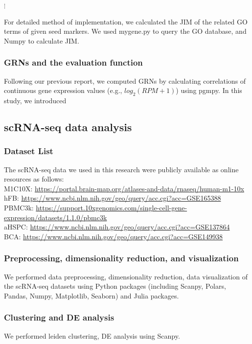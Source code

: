 \documentclass{article}
\begin{document}
$\vdots$

For detailed method of implementation, we calculated the JIM of the related GO terms of given seed markers. We used mygene.py\cite{mygene} to query the GO database, and Numpy\cite{numpy} to calculate JIM.

\subsubsection*{GRNs and the evaluation function}
Following our previous report\cite{okano2023set}, we computed GRNs by calculating
correlations of continuous gene expression values (e.g., $log_2(RPM+1)$) using pgmpy. In this study, we introduced

\subsection*{scRNA-seq data analysis}
\subsubsection*{Dataset List}
The scRNA-seq data we used in this research were publicly available as online
resources as follows:\\
M1C10X: \url{https://portal.brain-map.org/atlases-and-data/rnaseq/human-m1-10x}\\
hFB: \url{https://www.ncbi.nlm.nih.gov/geo/query/acc.cgi?acc=GSE165388}\\
PBMC3k: \url{https://support.10xgenomics.com/single-cell-gene-expression/datasets/1.1.0/pbmc3k}\\
aHSPC: \url{https://www.ncbi.nlm.nih.gov/geo/query/acc.cgi?acc=GSE137864}\\
BCA: \url{https://www.ncbi.nlm.nih.gov/geo/query/acc.cgi?acc=GSE149938}

\subsubsection*{Preprocessing, dimensionality reduction, and visualization}
We performed data preprocessing, dimensionality reduction, data visualization
of the scRNA-seq datasets using Python packages (including Scanpy\cite{scanpy}, Polars,
Pandas\cite{pandas}, Numpy, Matplotlib\cite{matplotlib}, Seaborn\cite{seaborn}) and Julia packages.

\subsubsection*{Clustering and DE analysis}
We performed leiden clustering, DE analysis using Scanpy.
\end{document}
